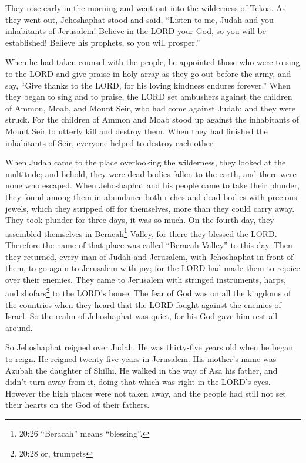 \myverse{}They rose early in the morning and went out into the wilderness
of Tekoa. As they went out, Jehoshaphat stood and said, “Listen to me, Judah and you inhabitants of Jerusalem!
Believe in the LORD your God, so you will be established! Believe his prophets, so you will prosper.”

\myverse{}When he had taken counsel with the people, he appointed those
who were to sing to the LORD and give praise in holy array as they go out before the army, and say, “Give
thanks to the LORD, for his loving kindness endures forever.”
\myverse{}When they began to sing and to praise, the LORD set ambushers against the
children of Ammon, Moab, and Mount Seir, who had come against Judah; and they were struck.
\myverse{}For the children of Ammon and Moab stood up against the inhabitants of Mount
Seir to utterly kill and destroy them. When they had finished the inhabitants of Seir, everyone helped
to destroy each other.

\myverse{}When Judah came to the place overlooking the wilderness, they
looked at the multitude; and behold, they were dead bodies fallen to the earth, and there were none who
escaped.
\myverse{}When Jehoshaphat and his people came to take their plunder, they found among
them in abundance both riches and dead bodies with precious jewels, which they stripped off for themselves,
more than they could carry away. They took plunder for three days, it was so much.
\myverse{}On the fourth day, they assembled themselves in Beracah\footnote{20:26 “Beracah” means “blessing”.} Valley, for there they blessed the LORD. Therefore the name
of that place was called “Beracah Valley” to this day.
\myverse{}Then they returned, every man of Judah and Jerusalem, with Jehoshaphat in
front of them, to go again to Jerusalem with joy; for the LORD had made them to rejoice over their enemies.
\myverse{}They came to Jerusalem with stringed instruments, harps, and shofars\footnote{20:28 or, trumpets}
to the LORD’s house.
\myverse{}The fear of God was on all the kingdoms of the countries when they heard
that the LORD fought against the enemies of Israel.
\myverse{}So the realm of Jehoshaphat was quiet, for his God gave him rest all around.

\myverse{}So Jehoshaphat reigned over Judah. He was thirty-five years
old when he began to reign. He reigned twenty-five years in Jerusalem. His mother’s name was Azubah the
daughter of Shilhi.
\myverse{}He walked in the way of Asa his father, and didn’t turn away from it, doing
that which was right in the LORD’s eyes.
\myverse{}However the high places were not taken away, and the people had still not
set their hearts on the God of their fathers.

